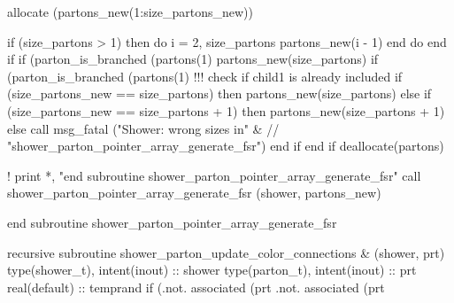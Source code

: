      allocate (partons_new(1:size_partons_new))

      if (size_partons > 1) then
         do i = 2, size_partons
            partons_new(i - 1)%
         end do
      end if
      if (parton_is_branched (partons(1)%
           partons_new(size_partons)%
      if (parton_is_branched (partons(1)%
         !!! check if child1 is already included
         if (size_partons_new == size_partons) then
            partons_new(size_partons)%
         else if (size_partons_new == size_partons + 1) then
            partons_new(size_partons + 1)%
         else
            call msg_fatal ("Shower: wrong sizes in" &
                 // "shower_parton_pointer_array_generate_fsr")
         end if
      end if
      deallocate(partons)

      ! print *, "end subroutine shower_parton_pointer_array_generate_fsr"
      call shower_parton_pointer_array_generate_fsr (shower, partons_new)

    end subroutine shower_parton_pointer_array_generate_fsr

\eatline
\nwendcode{}\nwdocspar
\nwenddocs{}\plusendmoddef
  recursive subroutine shower_parton_update_color_connections &
       (shower, prt)
    type(shower_t), intent(inout) :: shower
    type(parton_t), intent(inout) :: prt
    real(default) :: temprand
    if (.not. associated (prt%
         .not. associated (prt%

